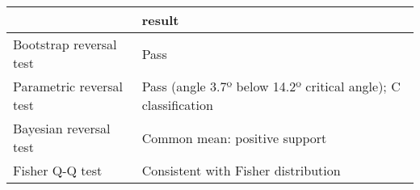 \begin{tabular}{ll}
\toprule
{} &                                                          result \\
\midrule
Bootstrap reversal test  &                                                            Pass \\
Parametric reversal test &  Pass (angle 3.7º below 14.2º critical angle); C classification \\
Bayesian reversal test   &                                   Common mean: positive support \\
Fisher Q-Q test          &                             Consistent with Fisher distribution \\
\bottomrule
\end{tabular}
